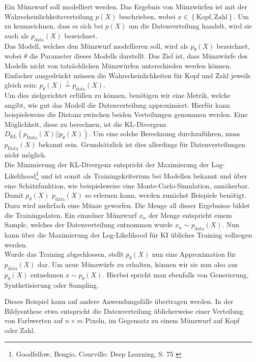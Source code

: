 Ein Münzwurf soll modelliert werden. Das Ergebnis von Münzwürfen ist mit der Wahrscheinlichkeitsverteilung $p(X)$ beschrieben, wobei $x \in \left \{ \text{Kopf}, \text{Zahl} \right \}$. Um zu kennzeichnen, dass es sich bei $p(X)$ um die Datenverteilung handelt, wird sie auch als $p_\text{data}(X)$ bezeichnet. \\
Das Modell, welches den Münzwurf modellieren soll, wird als $p_\theta(X)$ bezeichnet, wobei $\theta$ die Parameter dieses Modells darstellt. Das Ziel ist, dass Münzwürfe des Modells nicht von tatsächlichen Münzwürfen unterschieden werden können. Einfacher ausgedrückt müssen die Wahrscheinlichkeiten für Kopf und Zahl jeweils gleich sein: $p_\theta(X) \overset{!}{=} p_\text{data}(X)$. \\ 
Um dies zielgerichtet erfüllen zu können, benötigen wir eine Metrik, welche angibt, wie gut das Modell die Datenverteilung approximiert. Hierfür kann beispielsweise die Distanz zwischen beiden Verteilungen genommen werden. Eine Möglichkeit, diese zu berechnen, ist die KL-Divergenz $D_\text{KL}(p_\text{Data}(X)||p_\theta(X))$. Um eine solche Berechnung durchzuführen, muss $p_\text{Data}(X)$ bekannt sein. Grundsätzlich ist dies allerdings für Datenverteilungen nicht möglich. \\
Die Minimierung der KL-Divergenz entspricht der Maximierung der Log-Likelihood\footnote{
    Goodfellow, Bengio, Courville: Deep Learning, S. 75
    \cite{Goodfellow-et-al-2016}
} und ist somit als Trainingskriterium bei Modellen bekannt und über eine Schätzfunktion, wie beispielsweise eine Monte-Carlo-Simulation, annäherbar.
Damit $p_\theta(X)$ $p_\text{data}(X)$ so erlernen kann, werden zunächst Beispiele benötigt. Dazu wird mehrfach eine Münze geworfen. Die Menge all dieser Ergebnisse bildet die Trainingsdaten. Ein einzelner Münzwurf $x_n$ der Menge entspricht einem Sample, welches der Datenverteilung entnommen wurde $x_n \sim p_\text{data}(X)$. Nun kann über die Maximierung der Log-Likelihood für \ac{KI} übliches Training vollzogen werden. \\
Wurde das Training abgschlossen, stellt $p_\theta(X)$ nun eine Approximation für $p_\text{data}(X)$ dar. Um neue Münzwürfe zu erhalten, können wir sie nun also aus $p_\theta(X)$ entnehmen $x \sim p_\theta(X)$. Hierbei spricht man ebenfalls von Generierung, Synthetisierung oder Sampling.

Dieses Beispiel kann auf andere Anwendungsfälle übertragen werden. In der Bildysnthese etwa entspricht die Datenverteilung üblicherweise einer Verteilung von Farbwerten auf $n \times m$ Pixeln, im Gegensatz zu einem Münzwurf auf Kopf oder Zahl.

